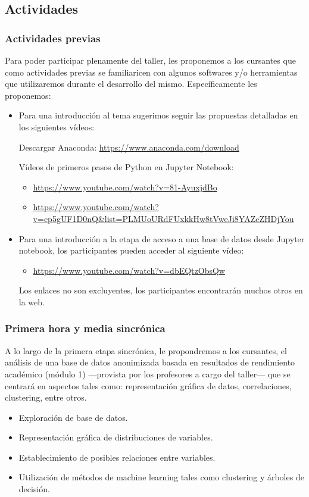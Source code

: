 \subsection{Actividades}

\subsubsection{Actividades previas}

Para poder participar plenamente del taller, les proponemos a los cursantes que como actividades previas se familiaricen con algunos softwares y/o herramientas que utilizaremos durante el desarrollo del mismo. Específicamente les proponemos:

\begin{itemize}
	\item Para una introducción al tema sugerimos seguir las propuestas detalladas en los siguientes vídeos:
	
	Descargar Anaconda: \url{https://www.anaconda.com/download}
	
	Vídeos de primeros pasos de Python en Jupyter Notebook:
	\begin{itemize}
		\item \url{https://www.youtube.com/watch?v=81-AyuxjdBo}
		\item \url{https://www.youtube.com/watch?v=cp5gUF1D0nQ\&list=PLMUoURdFUxkkHw8tVweJi8YAZcZHDjYou}
	\end{itemize}
	
	\item Para una introducción a la etapa de acceso a una base de datos desde Jupyter notebook, los participantes pueden acceder al siguiente vídeo:
	\begin{itemize}
		\item \url{https://www.youtube.com/watch?v=dbEQtzObsQw}
	\end{itemize}
	
	Los enlaces no son excluyentes, los participantes encontrarán muchos otros en la web.
\end{itemize}

\subsubsection{Primera hora y media sincrónica}\label{primera-hora-y-media-sincronica}

A lo largo de la primera etapa sincrónica, le propondremos a los cursantes, el análisis de una base de datos anonimizada basada en resultados de rendimiento académico (módulo 1) —provista por los profesores a cargo del taller— que se centrará en aspectos tales como: representación gráfica de datos, correlaciones, clustering, entre otros.
\begin{itemize}
	\item Exploración de base de datos.
	\item Representación gráfica de distribuciones de variables.
	\item Establecimiento de posibles relaciones entre variables.
	\item Utilización de métodos de machine learning tales como clustering y árboles de decisión.
\end{itemize}

